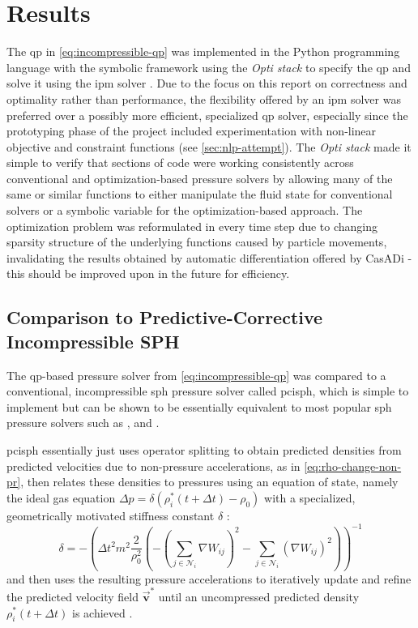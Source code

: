 \documentclass[conference]{IEEEtran}
\newcommand\vek[1]{\vec{\bm{#1}}}
\newcommand\br[1]{\left(#1\right)}
\begin{document}
\section{Results}\label{sec:results}
The \ac{qp} in \autoref{eq:incompressible-qp} was implemented in the Python programming language with the symbolic framework \autocite[CasADi]{casadi} using the \textit{Opti stack} to specify the \ac{qp} and solve it using the \ac{ipm} solver \autocite[IPOPT]{ipopt}. Due to the focus on this report on correctness and optimality rather than performance, the flexibility offered by an \ac{ipm} solver was preferred over a possibly more efficient, specialized \ac{qp} solver, especially since the prototyping phase of the project included experimentation with non-linear objective and constraint functions (see \autoref{sec:nlp-attempt}). The \textit{Opti stack} made it simple to verify that sections of code were working consistently across conventional and optimization-based pressure solvers by allowing many of the same or similar functions to either manipulate the fluid state for conventional solvers or a symbolic variable for the optimization-based approach. The optimization problem was reformulated in every time step due to changing sparsity structure of the underlying functions caused by particle movements, invalidating the results obtained by automatic differentiation offered by CasADi - this should be improved upon in the future for efficiency.

\subsection{Comparison to Predictive-Corrective Incompressible SPH}
The \ac{qp}-based pressure solver from \autoref{eq:incompressible-qp} was compared to a conventional, incompressible \ac{sph} pressure solver called \acf{pcisph}, which is simple to implement but can be shown to be essentially equivalent \cite{survey2022} to most popular \ac{sph} pressure solvers such as \autocite[\ac{pbf}]{pbf}, \autocite[\ac{iisph}]{iisph} and \autocite[\ac{dfsph}]{dfsph}.

\ac{pcisph} essentially just uses operator splitting to obtain predicted densities from predicted velocities due to non-pressure accelerations, as in \autoref{eq:rho-change-non-pr}, then relates these densities to pressures using an equation of state, namely the ideal gas equation $\Delta p = \delta \br{\rho_i^*(t+\Delta t) - \rho_0}$ with a specialized, geometrically motivated stiffness constant $\delta$ \cite{pcisph}:
\begin{equation}
  \delta = -\br{
    \Delta t^2m^2\frac{2}{\rho_0^2} \br{
      -\br{\sum_{j\in\mathcal{N}_i} \nabla W_{ij}}^2 - \sum_{j\in\mathcal{N}_i} \br{\nabla W_{ij}}^2
    }
  }^{-1}
\end{equation}
and then uses the resulting pressure accelerations to iteratively update and refine the predicted velocity field $\vek{v}^*$ until an uncompressed predicted density $\rho_i^*(t+\Delta t)$ is achieved \cite{pcisph}. 
\end{document}
